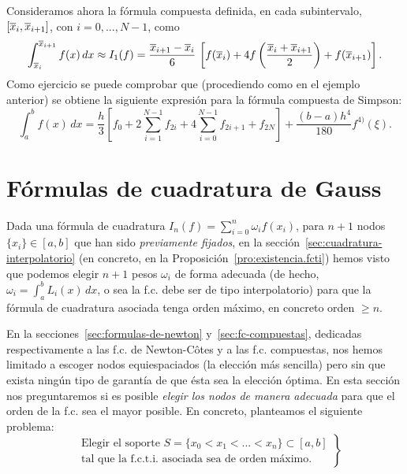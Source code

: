 \begin{example} 
  Consideramos ahora la fórmula compuesta definida, en cada
  subintervalo, $[\overline x_{i},\overline x_{i+1}]$, con $i=0,...,N-1$, como
   \begin{equation*}
    \int_{\overline x_{i}}^{\overline x_{i+1}} f(x)\, dx \approx I_1(f)=
    \frac{\overline x_{i+1}-\overline x_{i}}{6} \, \left[f(\overline x_i) +
      4f\left(\frac{\overline x_{i}+\overline x_{i+1}}{2}\right)+f(\overline x_{i+1})\right].
  \end{equation*}
  Como ejercicio se puede comprobar que (procediendo como en el
  ejemplo anterior) se obtiene la siguiente expresión para la fórmula
  compuesta de Simpson:
  \begin{equation*}
    \int_a^b f(x)\,dx
    = \frac{h}{3} \left[
      f_0
      + 2\sum_{i=1}^{N-1} f_{2i}
      + 4\sum_{i=0}^{N-1} f_{2i+1}
      + f_{2N} \right]
    + \frac{(b-a)h^4}{180} f^{4)}(\xi).
  \end{equation*}
\end{example}

\section{Fórmulas de cuadratura de Gauss}
\label{sec:fc-Gauss}
Dada una fórmula de cuadratura $I_n(f)=\sum_{i=0}^n \omega_i f(x_i)$,
para $n+1$ nodos $\{x_i\}\in [a,b]$ que han sido \textit{previamente
  fijados}, en la sección~\ref{sec:cuadratura-interpolatorio} (en
concreto, en la Proposición~\ref{pro:existencia.fcti}) hemos visto que
podemos elegir $n+1$ pesos $\omega_i$ de forma adecuada (de hecho,
$\omega_i=\int_a^b L_i(x)\, dx$, o sea la f.c. debe ser de tipo
interpolatorio) para que la fórmula de cuadratura asociada tenga orden
máximo, en concreto orden $\ge n$.

En la secciones~\ref{sec:formulas-de-newton}
y~\ref{sec:fc-compuestas}, dedicadas respectivamente a las f.c. de
Newton-Côtes y a las f.c. compuestas, nos hemos limitado a escoger
nodos equiespaciados (la elección más sencilla) pero sin que exista
ningún tipo de garantía de que ésta sea la elección óptima. En esta
sección nos preguntaremos si es posible \textit{elegir los nodos de manera
adecuada} para que el orden de la f.c. sea el mayor posible. En
concreto, planteamos el siguiente problema:
\begin{equation}
\label{eq:pb.fc.Gauss}
\tag{P}
\left.
  \begin{aligned}
    &\text{Elegir el soporte $S=\{x_0<x_1<...<x_n\}\subset [a,b]$}
    \\
    &\text{tal que la f.c.t.i. asociada sea de orden máximo.}
  \end{aligned}
\right\}
\end{equation}

